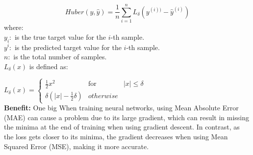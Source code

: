 \begin{itemize}
\begin{itemize}
     $$Huber(y,\hat{y})=\frac{1}{n}\sum_{i=1}^{n}L_{\delta}(y^{(i))}-\hat{y}^{(i)})$$
     where: \\
     $y_{i}: $ is the true target value for the \(i\)-th sample.\\
      $y^{i}: $ is the predicted target value for the \(i\)-th sample.\\
      $n: $ is the total number of samples.\\
      $L_{\delta}(x)$ is defined as:
      
      $L_{\delta}(x)=\left\{\begin{array}{rcl}
           \frac{1}{2}x^{2} & \mbox{for} & |x| \leq \delta \\
          \delta(|x|-\frac{1}{2}\delta) & otherwise 
      \end{array}\right.$\\
      \textbf{Benefit: } One big When training neural networks, using Mean Absolute Error (MAE) can cause a problem due to its large gradient, which can result in missing the minima at the end of training when using gradient descent. In contrast, as the loss gets closer to its minima, the gradient decreases when using Mean Squared Error (MSE), making it more accurate.
    

\end{itemize}
\end{itemize}
